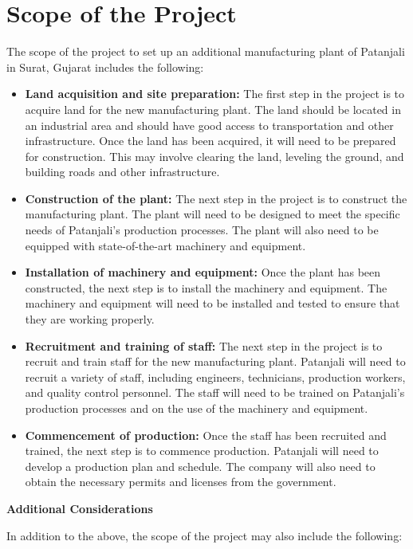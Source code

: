 \section{Scope of the Project}
The scope of the project to set up an additional manufacturing plant of Patanjali in Surat, Gujarat includes the following:

\begin{itemize}
    \item \textbf{Land acquisition and site preparation:} The first step in the project is to acquire land for the new manufacturing plant. The land should be located in an industrial area and should have good access to transportation and other infrastructure. Once the land has been acquired, it will need to be prepared for construction. This may involve clearing the land, leveling the ground, and building roads and other infrastructure.
    \item \textbf{Construction of the plant:} The next step in the project is to construct the manufacturing plant. The plant will need to be designed to meet the specific needs of Patanjali's production processes. The plant will also need to be equipped with state-of-the-art machinery and equipment.
    \item \textbf{Installation of machinery and equipment:} Once the plant has been constructed, the next step is to install the machinery and equipment. The machinery and equipment will need to be installed and tested to ensure that they are working properly.
    \item \textbf{Recruitment and training of staff:} The next step in the project is to recruit and train staff for the new manufacturing plant. Patanjali will need to recruit a variety of staff, including engineers, technicians, production workers, and quality control personnel. The staff will need to be trained on Patanjali's production processes and on the use of the machinery and equipment.
    \item \textbf{Commencement of production:} Once the staff has been recruited and trained, the next step is to commence production. Patanjali will need to develop a production plan and schedule. The company will also need to obtain the necessary permits and licenses from the government.
\end{itemize}

\textbf{Additional Considerations}

In addition to the above, the scope of the project may also include the following:

